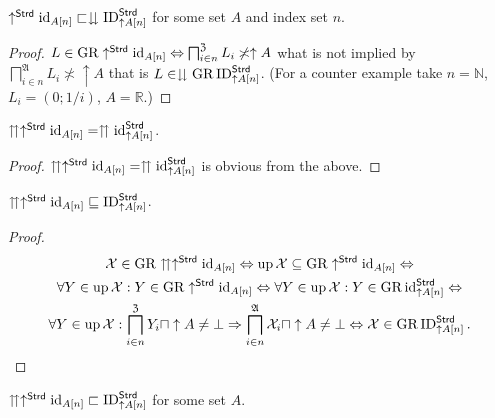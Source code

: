 \begin{prop}
$\uparrow^{\mathsf{Strd}}\operatorname{id}_{A[n]}\sqsubset\downdownarrows\operatorname{ID}_{\uparrow A[n]}^{\mathsf{Strd}}$
for some set $A$ and index set $n$.\end{prop}
\begin{proof}
$L\in\operatorname{GR}\uparrow^{\mathsf{Strd}}\operatorname{id}_{A[n]}\Leftrightarrow\bigsqcap_{i\in n}^{\mathfrak{Z}}L_{i}\not\asymp\uparrow A$
what is not implied by $\bigsqcap_{i\in n}^{\mathfrak{A}}L_{i}\nasymp\uparrow A$
that is $L\in\downdownarrows\operatorname{GR}\operatorname{ID}_{\uparrow A[n]}^{\mathsf{Strd}}$.
(For a counter example take $n=\mathbb{N}$, $L_{i}=(0;1/i)$, $A=\mathbb{R}$.)\end{proof}
\begin{prop}
$\upuparrows\uparrow^{\mathsf{Strd}}\operatorname{id}_{A[n]}=\upuparrows\operatorname{id}_{\uparrow A[n]}^{\mathsf{Strd}}$.\end{prop}
\begin{proof}
$\upuparrows\uparrow^{\mathsf{Strd}}\operatorname{id}_{A[n]}=\upuparrows\operatorname{id}_{\uparrow A[n]}^{\mathsf{Strd}}$
is obvious from the above.\end{proof}
\begin{prop}
$\upuparrows\uparrow^{\mathsf{Strd}}\operatorname{id}_{A[n]}\sqsubseteq\operatorname{ID}_{\uparrow A[n]}^{\mathsf{Strd}}$.\end{prop}
\begin{proof}
~
\begin{multline*}
\mathcal{X}\in\operatorname{GR}\upuparrows\uparrow^{\mathsf{Strd}}\operatorname{id}_{A[n]}\Leftrightarrow\operatorname{up}\mathcal{X}\subseteq\operatorname{GR}\uparrow^{\mathsf{Strd}}\operatorname{id}_{A[n]}\Leftrightarrow\\
\forall Y\in\operatorname{up}\mathcal{X}:Y\in\operatorname{GR}\uparrow^{\mathsf{Strd}}\operatorname{id}_{A[n]}\Leftrightarrow\forall Y\in\operatorname{up}\mathcal{X}:Y\in\operatorname{GR}\operatorname{id}_{\uparrow A[n]}^{\mathsf{Strd}}\Leftrightarrow\\
\forall Y\in\operatorname{up}\mathcal{X}:\bigsqcap_{i\in n}^{\mathfrak{Z}}Y_{i}\sqcap\uparrow A\neq\bot\Rightarrow\bigsqcap_{i\in n}^{\mathfrak{A}}\mathcal{X}_{i}\sqcap\uparrow A\neq\bot\Leftrightarrow\mathcal{X}\in\operatorname{GR}\operatorname{ID}_{\uparrow A[n]}^{\mathsf{Strd}}.
\end{multline*}
\end{proof}
\begin{prop}
$\upuparrows\uparrow^{\mathsf{Strd}}\operatorname{id}_{A[n]}\sqsubset\operatorname{ID}_{\uparrow A[n]}^{\mathsf{Strd}}$
for some set $A$.\end{prop}
